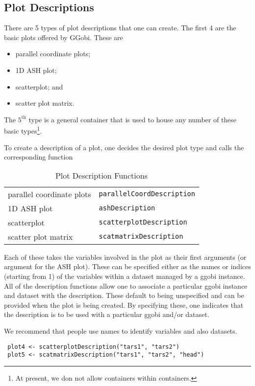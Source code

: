 \documentclass{article}
\def\SFunction#1{{\texttt{\red #1}}}
\begin{document}
\subsection{Plot Descriptions}
There are 5 types of plot descriptions that one can create.
The first 4 are the basic plots offered by GGobi.
These are
\begin{itemize}
\item parallel coordinate plots;
\item 1D ASH plot;
\item scatterplot; and
\item scatter plot matrix. 
\end{itemize}
The $5^{\mbox{th}}$ type is a general container that 
is used to house any number of these basic types\footnote{At present,
we don not allow containers within containers.}.

To create a description of a plot, one decides the desired plot type
and calls the corresponding function
\begin{table}[htbp]
  \begin{center}
    \leavevmode
    \begin{tabular}{ll}
 parallel coordinate plots & 
\SFunction{parallelCoordDescription}
\\
 1D ASH plot & 
\SFunction{ashDescription}
\\
 scatterplot & 
\SFunction{scatterplotDescription}
\\
 scatter plot matrix & 
\SFunction{scatmatrixDescription}
\\
    \end{tabular}
    \caption{Plot Description Functions}
    \label{tab:PlotDescriptions}
  \end{center}
\end{table}
Each of these takes the variables involved in the plot as their first
arguments (or argument for the ASH plot).  These can be specified
either as the names or indices (starting from 1) of the variables
within a dataset managed by a ggobi instance.  All of the description
functions allow one to associate a particular ggobi instance and
dataset with the description.   These default to being unspecified
and can be provided when the plot is being created.
By specifying these, one indicates that
the description is to be used with a particular ggobi and/or dataset.

We recommend that people use names to identify variables
and also datasets.

\begin{verbatim}
 plot4 <- scatterplotDescription("tars1", "tars2")
 plot5 <- scatmatrixDescription("tars1", "tars2", "head")
\end{verbatim}
\end{document}
